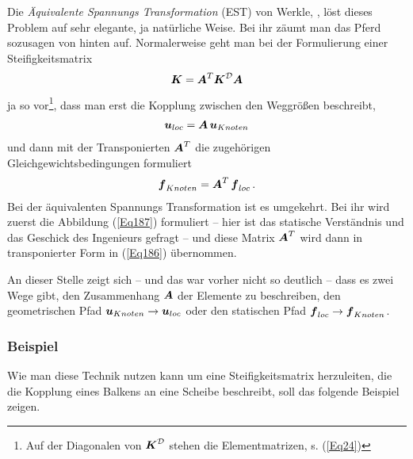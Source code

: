 Die  {\em \"{A}quivalente Spannungs Transformation\/} (EST) von Werkle, \cite{Werkle1}, l\"{o}st dieses Problem auf sehr elegante, ja nat\"{u}rliche Weise. Bei ihr z\"{a}umt man das Pferd sozusagen von hinten auf. Normalerweise geht man bei der Formulierung einer Steifigkeitsmatrix
\begin{align}
\mbox{\boldmath $K$} = \mbox{\boldmath $A$}^T\mbox{\boldmath $K$}^{\mathcal{D}} \mbox{\boldmath $A$}
\end{align}
ja so vor\footnote{Auf der Diagonalen von $\mbox{\boldmath $K$}^{\mathcal{D}} $ stehen die Elementmatrizen, s. (\ref{Eq24}) }, dass man erst die Kopplung zwischen den Weggr\"{o}{\ss}en beschreibt,
\begin{align} \label{Eq186}
\mbox{\boldmath $u$}_{loc} = \mbox{\boldmath $A$}\,\mbox{\boldmath $u$}_{Knoten}
\end{align}
und dann mit der Transponierten $\mbox{\boldmath $A$}^T$ die zugeh\"{o}rigen Gleichgewichtsbedingungen formuliert
\begin{align} \label{Eq187}
\mbox{\boldmath $f$}_{Knoten} = \mbox{\boldmath $A$}^T\,\mbox{\boldmath $f$}_{loc}\,.
\end{align}
Bei der \"{a}quivalenten Spannungs Transformation ist es umgekehrt. Bei ihr wird zuerst die Abbildung (\ref{Eq187}) formuliert -- hier ist das statische Verst\"{a}ndnis und das Geschick des Ingenieurs gefragt -- und diese Matrix $\mbox{\boldmath $A$}^T$ wird dann in transponierter Form in (\ref{Eq186}) \"{u}bernommen.

An dieser Stelle zeigt sich -- und das war vorher nicht so deutlich -- dass es zwei Wege gibt, den Zusammenhang $\mbox{\boldmath $A$}$ der Elemente zu beschreiben, den geometrischen Pfad $\mbox{\boldmath $u$}_{Knoten} \to \mbox{\boldmath $u$}_{loc}$ oder den statischen Pfad $\mbox{\boldmath $f$}_{loc} \to \mbox{\boldmath $f$}_{Knoten}$.\\


\textcolor{chapterTitleBlue}{\subsubsection*{Beispiel}}

Wie man diese Technik nutzen kann um eine Steifigkeitsmatrix herzuleiten, die die Kopplung eines Balkens an eine Scheibe beschreibt, soll das folgende Beispiel zeigen.

